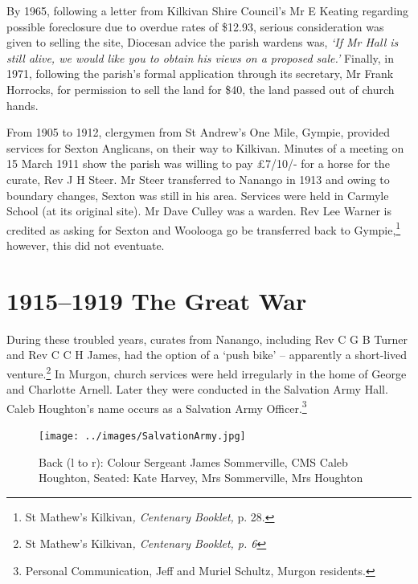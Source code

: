 By 1965, following a letter from Kilkivan Shire Council's Mr E Keating regarding possible foreclosure due to overdue rates of \$12.93, serious consideration was given to selling the site, Diocesan advice the parish wardens was, \emph{`If Mr Hall is still alive, we would like you to obtain his views on a proposed sale.'} Finally, in 1971, following the parish's formal application through its secretary, Mr Frank Horrocks, for permission to sell the land for \$40, the land passed out of church hands.



From 1905 to 1912, clergymen from St Andrew's One Mile, Gympie, provided services for Sexton Anglicans, on their way to Kilkivan. Minutes of a meeting on 15 March 1911 show the parish was willing to pay \pounds7/10/- for a horse for the curate, Rev J H Steer. Mr Steer transferred to Nanango in 1913 and owing to boundary changes, Sexton was still in his area. Services were held in Carmyle School (at its original site). Mr Dave Culley was a warden. Rev Lee Warner is credited as asking for Sexton and Woolooga go be transferred back to Gympie,\footnote{St Mathew's Kilkivan\emph{, Centenary Booklet,} p. 28.} however, this did not eventuate.


\section{1915--1919 The Great War}



During these troubled years, curates from Nanango, including Rev C G B Turner and Rev C C H James, had the option of a `push bike' -- apparently a short-lived venture.\footnote{St Mathew's Kilkivan\emph{, Centenary Booklet, p. 6}} In Murgon, church services were held irregularly in the home of George and Charlotte Arnell. Later they were conducted in the Salvation Army Hall. Caleb Houghton's name occurs as a Salvation Army Officer.\footnote{Personal Communication, Jeff and Muriel Schultz, Murgon residents.}








\begin{figure}
\begin{center}
\texttt{[image: ../images/SalvationArmy.jpg]}
\caption{Back (l to r): Colour Sergeant James Sommerville, CMS Caleb Houghton, Seated: Kate Harvey, Mrs Sommerville, Mrs Houghton}
\end{center}
\end{figure}




